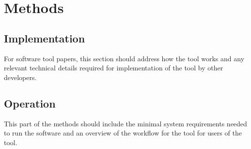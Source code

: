 \section*{Methods}
\subsection*{Implementation}
For software tool papers, this section should address how the tool works and any relevant technical details required for implementation of the tool by other developers.  


\subsection*{Operation}
This part of the methods should include the minimal system requirements needed to run the software and an overview of the workflow for the tool for users of the tool.
